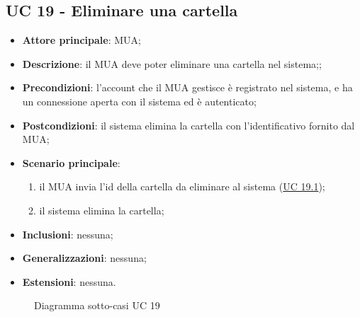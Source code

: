 \subsection{UC 19 - Eliminare una cartella} \label{sec:UC19}
    \begin{itemize}
        \item \textbf{Attore principale}: MUA;
        \item \textbf{Descrizione}: il MUA deve poter eliminare una cartella nel sistema;;
        \item \textbf{Precondizioni}: l’account che il MUA gestisce è registrato nel sistema, e ha un connessione aperta con il sistema ed è autenticato;
        \item \textbf{Postcondizioni}: il sistema elimina la cartella con l'identificativo fornito dal MUA;
        \item \textbf{Scenario principale}:
            \begin{enumerate}
                \item il MUA invia l'id della cartella da eliminare al sistema (\hyperref[sec:UC19.1]{UC 19.1});
                \item il sistema elimina la cartella;
            \end{enumerate}
        \item \textbf{Inclusioni}: nessuna;
        \item \textbf{Generalizzazioni}: nessuna;
        \item \textbf{Estensioni}: nessuna.
    \end{itemize}

\begin{figure}[h]
    \centering
    \caption{Diagramma sotto-casi UC 19}
\end{figure}

